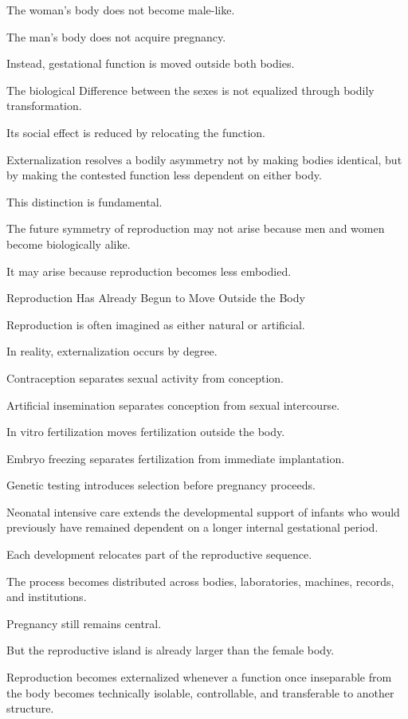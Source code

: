 The woman’s body does not become male-like.

The man’s body does not acquire pregnancy.

Instead, gestational function is moved outside both bodies.

The biological Difference between the sexes is not equalized through bodily transformation.

Its social effect is reduced by relocating the function.

Externalization resolves a bodily asymmetry not by making bodies identical, but by making the contested function less dependent on either body.

This distinction is fundamental.

The future symmetry of reproduction may not arise because men and women become biologically alike.

It may arise because reproduction becomes less embodied.

Reproduction Has Already Begun to Move Outside the Body

Reproduction is often imagined as either natural or artificial.

In reality, externalization occurs by degree.

Contraception separates sexual activity from conception.

Artificial insemination separates conception from sexual intercourse.

In vitro fertilization moves fertilization outside the body.

Embryo freezing separates fertilization from immediate implantation.

Genetic testing introduces selection before pregnancy proceeds.

Neonatal intensive care extends the developmental support of infants who would previously have remained dependent on a longer internal gestational period.

Each development relocates part of the reproductive sequence.

The process becomes distributed across bodies, laboratories, machines, records, and institutions.

Pregnancy still remains central.

But the reproductive island is already larger than the female body.

Reproduction becomes externalized whenever a function once inseparable from the body becomes technically isolable, controllable, and transferable to another structure.

